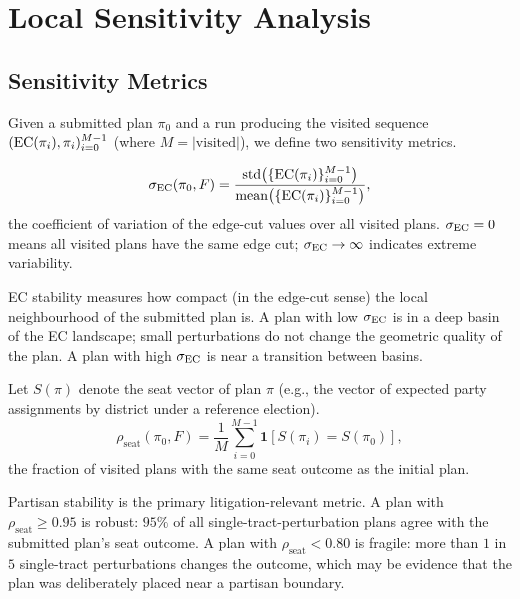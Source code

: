 \section{Local Sensitivity Analysis}
\label{sec:sensitivity}

\subsection{Sensitivity Metrics}

Given a submitted plan $\pi_0$ and a \flip{} run producing the visited
sequence $(\mathrm{EC}(\pi_i), \pi_i)_{i=0}^{M-1}$ (where $M = |\mathrm{visited}|$),
we define two sensitivity metrics.

\begin{definition}[EC stability]
\label{def:ec-stability}
\[
  \sigma_{\mathrm{EC}}(\pi_0, F) = \frac{\mathrm{std}\bigl(\{\mathrm{EC}(\pi_i)\}_{i=0}^{M-1}\bigr)}
                                  {\mathrm{mean}\bigl(\{\mathrm{EC}(\pi_i)\}_{i=0}^{M-1}\bigr)},
\]
the coefficient of variation of the edge-cut values over all visited plans.
$\sigma_{\mathrm{EC}} = 0$ means all visited plans have the same edge cut;
$\sigma_{\mathrm{EC}} \to \infty$ indicates extreme variability.
\end{definition}

EC stability measures how compact (in the edge-cut sense) the local
neighbourhood of the submitted plan is.
A plan with low $\sigma_{\mathrm{EC}}$ is in a deep basin of the EC landscape;
small perturbations do not change the geometric quality of the plan.
A plan with high $\sigma_{\mathrm{EC}}$ is near a transition between basins.

\begin{definition}
\label{def:partisan-stability}
Let $S(\pi)$ denote the seat vector of plan $\pi$ (e.g., the vector of
expected party assignments by district under a reference election).
\[
  \rho_{\mathrm{seat}}(\pi_0, F) = \frac{1}{M}
    \sum_{i=0}^{M-1} \mathbf{1}[S(\pi_i) = S(\pi_0)],
\]
the fraction of visited plans with the same seat outcome as the initial plan.
\end{definition}

Partisan stability is the primary litigation-relevant metric.
A plan with $\rho_{\mathrm{seat}} \geq 0.95$ is robust: $95\%$ of all
single-tract-perturbation plans agree with the submitted plan's seat outcome.
A plan with $\rho_{\mathrm{seat}} < 0.80$ is fragile: more than $1$ in $5$
single-tract perturbations changes the outcome, which may be evidence that
the plan was deliberately placed near a partisan boundary.

